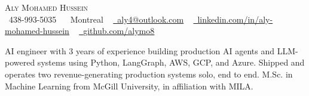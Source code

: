 \documentclass[letterpaper,11pt]{article}
\begin{document}
\begin{center}
    {\Huge \scshape Aly Mohamed Hussein} \\ \vspace{1pt}
    \small \raisebox{-0.1\height}\faPhone\ 438-993-5035 ~
    {\raisebox{-0.2\height}\faHome\ {Montreal}}  ~
    \href{mailto:aly4@outlook.com}{\raisebox{-0.2\height}\faEnvelope\  \underline{aly4@outlook.com}} ~
    \href{https://linkedin.com/in/aly-mohamed-hussein}{\raisebox{-0.2\height}\faLinkedin\ \underline{linkedin.com/in/aly-mohamed-hussein}}  ~
    \href{https://github.com/alymo8}{\raisebox{-0.2\height}\faGithub\ \underline{github.com/alymo8}}
    \vspace{-8pt}
\end{center}

\vspace{+5pt}
{AI engineer with 3 years of experience building production AI agents and LLM-powered systems using Python, LangGraph, AWS, GCP, and Azure. Shipped and operates two revenue-generating production systems solo, end to end. M.Sc. in Machine Learning from McGill University, in affiliation with MILA.}
\vspace{-8pt}

\end{document}
